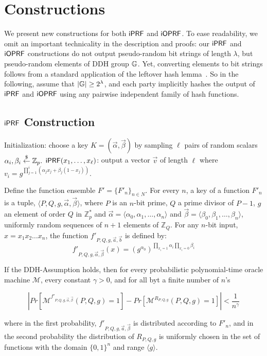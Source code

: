 \section{Constructions}
We present new constructions for both $\mathsf{i}\mathsf{PRF}$ and $\mathsf{i}\mathsf{OPRF}$.  To ease
readability, we omit an important technicality in the description and
proofs: our $\mathsf{i}\mathsf{PRF}$ and $\mathsf{i}\mathsf{OPRF}$ constructions do not output
pseudo-random bit strings of length $\lambda$, but pseudo-random
elements of DDH group $\mathbb{G}$. Yet, converting elements to bit strings
follows from a standard application of the leftover hash
lemma~\cite{leftover}. So in the following, assume that
$|\mathbb{G}|\ge{}2^\lambda$, and each party implicitly hashes the output of
$\mathsf{i}\mathsf{PRF}$ and $\mathsf{i}\mathsf{OPRF}$ using any pairwise independent family of hash
functions.


\subsection{$\mathsf{i}\mathsf{PRF}$ Construction}
Initialization: choose a key $K=(\vec{{\alpha}},\vec{\beta})$ by sampling
$\ell$ pairs of random scalars
${\alpha_{i}},{\beta_{i}}\stackrel{\$}{\leftarrow}\mathbb{Z}_p.$
$\mathsf{i}\mathsf{PRF}(x_1,\ldots,x_\ell)$: output a vector $\vec{v}$ of length $\ell$ where $v_i = g^{\prod_{j=1}^{i} (\alpha_jx_j+\beta_j(1-x_j))}.$

\label{sec:newprf}
\begin{construction}
\label{const:newprf}
Define the function ensemble $F' = \{F'_n\}_{n\in N}$.  For every $n$, a key of a function $F'_n$ is a tuple, $\langle P,Q,g,\vec{\alpha},\vec{\beta}\rangle$, 
where $P$ is an $n$-bit prime, $Q$ a prime divisor of $P-1$, $g$ an element of order $Q$ in $\mathbb{Z}_{p}^*$ and $\vec{\alpha}=\langle 
\alpha_0,\alpha_1, \ldots , \alpha_n \rangle$ and $\vec{\beta}=\langle 
\beta_0,\beta_1, \ldots ,\beta_n \rangle$, uniformly random sequences of $n+1$ elements of $\mathbb{Z}_Q$.  For any $n$-bit input, $x=x_1 x_2 \ldots x_n$, the 
function $f'_{P,Q,g,\vec{a},\vec{b}}$ is defined by:
 $$f'_{P,Q,g,\vec{\alpha},\vec{\beta}}(x) = (g^{\alpha_0})^{\prod_{x_i=1}\alpha_i \prod_{x_i=0}\beta_i}$$
 \end{construction}


 
\begin{theorem}
\label{theorem:newprf}

If the DDH-Assumption holds, then for every probabilistic polynomial-time oracle machine $\mathcal{M}$, every constant $\gamma > 0$, and for all byt a finite number of $n$'s

$$| Pr[\mathcal{M}^{f'_{P,Q,g,\vec{\alpha},\vec{\beta}}}(P,Q,g)=1] - Pr[\mathcal{M}^{R_{P,Q,g}}(P,Q,g) = 1]| < \frac{1}{n^\gamma} $$

where in the first probability, $f'_{P,Q,g,\vec{a},\vec{\beta}}$ is distributed according to $F'_n$, and in the second probability the distribution of $R_{P,Q,g}$ is uniformly chosen in the set of functions with the domain $\{0,1\}^n$ and range $\langle g\rangle$.
\end{theorem}

